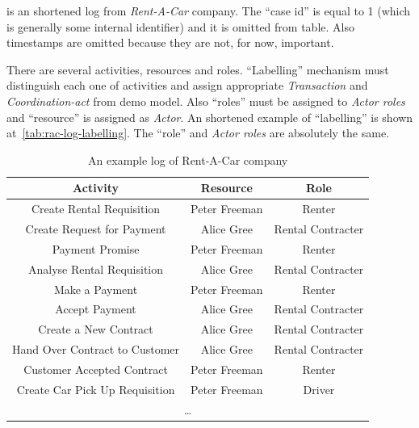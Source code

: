  is an shortened log from \textit{Rent-A-Car} company. The ``case id'' is equal to 1 (which is generally some internal identifier) and it is omitted from table. Also timestamps are omitted because they are not, for now, important.  

There are several activities, resources and roles. ``Labelling'' mechanism must distinguish each one of activities and assign appropriate \textit{Transaction} and \textit{Coordination-act} from \gls{demo} model. Also ``roles'' must be assigned to \textit{Actor roles} and ``resource'' is assigned as \textit{Actor}. An shortened example of ``labelling'' is shown at~\cref{tab:rac-log-labelling}. The ``role'' and \textit{Actor roles} are absolutely the same. 

\begin{table}[ht!]
\centering
\begin{tabular}{ | c | c | c | }
\hline
	\textbf{Activity} & \textbf{Resource} & \textbf{Role} \\ \hline
	Create Rental  Requisition & Peter Freeman & Renter \\ \hline
	Create Request for Payment & Alice Gree & Rental Contracter \\ \hline
	Payment Promise & Peter Freeman & Renter \\ \hline
	Analyse Rental Requisition & Alice Gree & Rental Contracter \\ \hline
	Make a Payment & Peter Freeman & Renter \\ \hline
	Accept Payment & Alice Gree & Rental Contracter \\ \hline
	Create a New Contract & Alice Gree & Rental Contracter \\ \hline
	Hand Over Contract to Customer & Alice Gree & Rental Contracter \\ \hline
	Customer Accepted Contract & Peter Freeman & Renter \\ \hline
	Create Car Pick Up  Requisition & Peter Freeman & Driver \\ \hline
    \multicolumn{3}{|c|}{\dots} \\ \hline
    
\end{tabular}
\caption{An example log of Rent-A-Car company}
\label{tab:rac-log}
  

\end{table}
